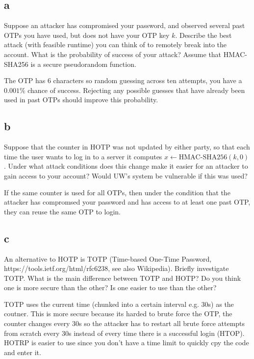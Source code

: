 \documentclass[11pt]{article}
\begin{document}
\subsection{a}

Suppose an attacker has compromised your password, and observed several past OTPs you have used, but does not have your OTP key $k$. Describe the best attack (with feasible runtime) you can think of to remotely break into the account. What is the probability of success of your attack? Assume that HMAC-SHA256 is a secure pseudorandom function. 

The OTP has 6 characters so random guessing across ten attempts, you have a $0.001\%$ chance of success. Rejecting any possible guesses that have already been used in past OTPs should improve this probability. 

\subsection{b}

Suppose that the counter in HOTP was not updated by either party, so that each time the user wants to log in to a server it computes $x \leftarrow \text{HMAC-SHA256}(k, 0)$. Under what attack conditions does this change make it easier for an attacker to gain access to your account? Would UW's system be vulnerable if this was used?

If the same counter is used for all OTPs, then under the condition that the attacker has compromsed your password and has access to at least one past OTP, they can reuse the same OTP to login. 

\subsection{c}

An alternative to HOTP is TOTP (Time-based One-Time Password, https://tools.ietf.org/html/rfc6238, see also Wikipedia). Briefly investigate TOTP. What is the main difference between TOTP and HOTP? Do you think one is more secure than the other? Is one easier to use than the other?

TOTP uses the current time (chunked into a certain interval e.g. 30s) as the coutner. This is more secure because its harded to brute force the OTP, the counter changes every 30s so the attacker has to restart all brute force attempts from scratch every 30s instead of every time there is a successful login (HTOP). HOTRP is easier to use since you don't have a time limit to quickly cpy the code and enter it.
\end{document}
